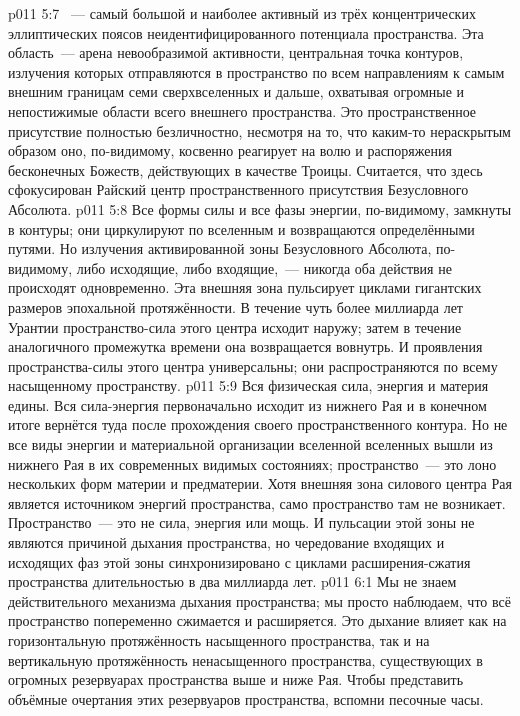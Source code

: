 \vs p011 5:7 \pc {}~--- самый большой и наиболее активный из трёх концентрических эллиптических поясов неидентифицированного потенциала пространства. Эта область~--- арена невообразимой активности, центральная точка контуров, излучения которых отправляются в пространство по всем направлениям к самым внешним границам семи сверхвселенных и дальше, охватывая огромные и непостижимые области всего внешнего пространства. Это пространственное присутствие полностью безличностно, несмотря на то, что каким\hyp{}то нераскрытым образом оно, по\hyp{}видимому, косвенно реагирует на волю и распоряжения бесконечных Божеств, действующих в качестве Троицы. Считается, что здесь сфокусирован Райский центр пространственного присутствия Безусловного Абсолюта.
\vs p011 5:8 Все формы силы и все фазы энергии, по\hyp{}видимому, замкнуты в контуры; они циркулируют по вселенным и возвращаются определёнными путями. Но излучения активированной зоны Безусловного Абсолюта, по\hyp{}видимому, либо исходящие, либо входящие,~--- никогда оба действия не происходят одновременно. Эта внешняя зона пульсирует циклами гигантских размеров эпохальной протяжённости. В течение чуть более миллиарда лет Урантии пространство\hyp{}сила этого центра исходит наружу; затем в течение аналогичного промежутка времени она возвращается вовнутрь. И проявления пространства\hyp{}силы этого центра универсальны; они распространяются по всему насыщенному пространству.
\vs p011 5:9 \pc Вся физическая сила, энергия и материя едины. Вся сила\hyp{}энергия первоначально исходит из нижнего Рая и в конечном итоге вернётся туда после прохождения своего пространственного контура. Но не все виды энергии и материальной организации вселенной вселенных вышли из нижнего Рая в их современных видимых состояниях; пространство~--- это лоно нескольких форм материи и предматерии. Хотя внешняя зона силового центра Рая является источником энергий пространства, само пространство там не возникает. Пространство~--- это не сила, энергия или мощь. И пульсации этой зоны не являются причиной дыхания пространства, но чередование входящих и исходящих фаз этой зоны синхронизировано с циклами расширения\hyp{}сжатия пространства длительностью в два миллиарда лет.
\vs p011 6:1 Мы не знаем действительного механизма дыхания пространства; мы просто наблюдаем, что всё пространство попеременно сжимается и расширяется. Это дыхание влияет как на горизонтальную протяжённость насыщенного пространства, так и на вертикальную протяжённость ненасыщенного пространства, существующих в огромных резервуарах пространства выше и ниже Рая. Чтобы представить объёмные очертания этих резервуаров пространства, вспомни песочные часы.
